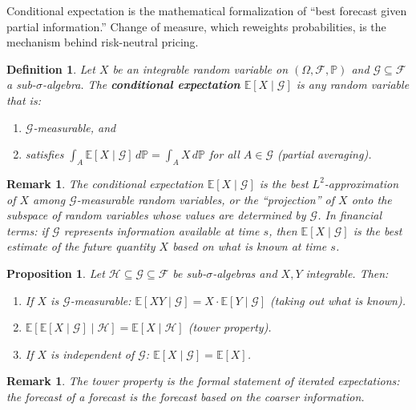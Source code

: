\documentclass{report}
\theoremstyle{spacedplain}
\newtheorem{proposition}[theorem]{Proposition}
\theoremstyle{spaceddefinition}
\newtheorem{definition}[theorem]{Definition}
\theoremstyle{spacedremark}
\newtheorem{remark}[theorem]{Remark}
\begin{document}
Conditional expectation is the mathematical formalization of ``best forecast given partial information.'' Change of measure, which reweights probabilities, is the mechanism behind risk-neutral pricing.

\begin{definition}
Let $X$ be an integrable random variable on $(\Omega, \mathcal{F}, \mathbb{P})$ and $\mathcal{G} \subseteq \mathcal{F}$ a sub-$\sigma$-algebra. The \textbf{conditional expectation} $\mathbb{E}[X \mid \mathcal{G}]$ is any random variable that is:
\begin{enumerate}
    \item $\mathcal{G}$-measurable, and
    \item satisfies $\int_A \mathbb{E}[X \mid \mathcal{G}]\, d\mathbb{P} = \int_A X\, d\mathbb{P}$ for all $A \in \mathcal{G}$ (partial averaging).
\end{enumerate}
\end{definition}

\begin{remark}
The conditional expectation $\mathbb{E}[X \mid \mathcal{G}]$ is the best $L^2$-approximation of $X$ among $\mathcal{G}$-measurable random variables, or the ``projection'' of $X$ onto the subspace of random variables whose values are determined by $\mathcal{G}$. In financial terms: if $\mathcal{G}$ represents information available at time $s$, then $\mathbb{E}[X \mid \mathcal{G}]$ is the best estimate of the future quantity $X$ based on what is known at time $s$.
\end{remark}

\begin{proposition}
Let $\mathcal{H} \subseteq \mathcal{G} \subseteq \mathcal{F}$ be sub-$\sigma$-algebras and $X, Y$ integrable. Then:
\begin{enumerate}
    \item If $X$ is $\mathcal{G}$-measurable: $\mathbb{E}[XY \mid \mathcal{G}] = X \cdot \mathbb{E}[Y \mid \mathcal{G}]$ (taking out what is known).
    \item $\mathbb{E}[\mathbb{E}[X \mid \mathcal{G}] \mid \mathcal{H}] = \mathbb{E}[X \mid \mathcal{H}]$ (tower property).
    \item If $X$ is independent of $\mathcal{G}$: $\mathbb{E}[X \mid \mathcal{G}] = \mathbb{E}[X]$.
\end{enumerate}
\end{proposition}

\begin{remark}
The tower property is the formal statement of iterated expectations: the forecast of a forecast is the forecast based on the coarser information.
\end{remark}
\end{document}

